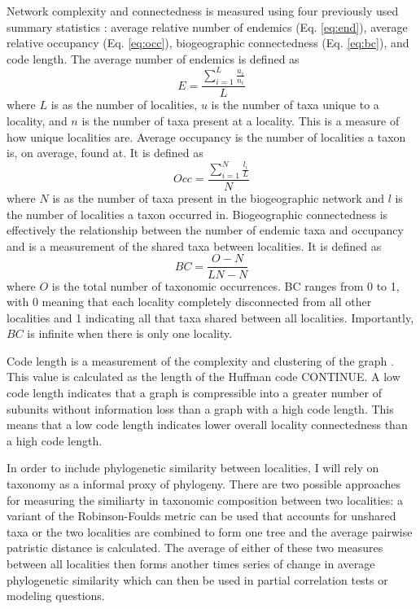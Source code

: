 \documentclass[12pt,letterpaper]{article}
\begin{document}
Network complexity and connectedness is measured using four previously used summary statistics \citep{Sidor2013}: average relative number of endemics (Eq. \ref{eq:end}), average relative occupancy (Eq. \ref{eq:occ}), biogeographic connectedness (Eq. \ref{eq:bc}), and code length. The average number of endemics is defined as 
\begin{equation}
  E = \frac{\sum_{i = 1}^{L} \frac{u_{i}}{n_{i}}}{L}
  \label{eq:end}
\end{equation}
where \(L\) is as the number of localities, \(u\) is the number of taxa unique to a locality, and \(n\) is the number of taxa present at a locality. This is a measure of how unique localities are. Average occupancy is the number of localities a taxon is, on average, found at. It is defined as 
\begin{equation}
  Occ = \frac{\sum_{i = 1}^{N} \frac{l_{i}}{L}}{N}
  \label{eq:occ}
\end{equation}
where \(N\) is as the number of taxa present in the biogeographic network and \(l\) is the number of localities a taxon occurred in. Biogeographic connectedness is effectively the relationship between the number of endemic taxa and occupancy and is a measurement of the shared taxa between localities. It is defined as 
\begin{equation}
  BC = \frac{O - N}{LN - N}
  \label{eq:bc}
\end{equation}
where \(O\) is the total number of taxonomic occurrences. BC ranges from 0 to 1, with 0 meaning that each locality completely disconnected from all other localities and 1 indicating all that taxa shared between all localities. Importantly, \(BC\) is infinite when there is only one locality.

Code length is a measurement of the complexity and clustering of the graph \citep{Rosvall2008,Rosvall2010b}. This value is calculated as the length of the Huffman code CONTINUE. A low code length indicates that a graph is compressible into a greater number of subunits without information loss than a graph with a high code length. This means that a low code length indicates lower overall locality connectedness than a high code length. 

In order to include phylogenetic similarity between localities, I will rely on taxonomy as a informal proxy of phylogeny. There are two possible approaches for measuring the similiarty in taxonomic composition between two localities: a variant of the Robinson-Foulds metric \citep{Robinson1981} can be used that accounts for unshared taxa or the two localities are combined to form one tree and the average pairwise patristic distance \citep{Sokal1962} is calculated. The average of either of these two measures between all localities then forms another times series of change in average phylogenetic similarity which can then be used in partial correlation tests or modeling questions.
\end{document}
